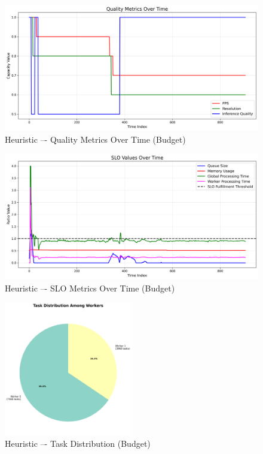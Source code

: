\begin{figure}[h]
    \centering
    \includegraphics[width=\textwidth]{img/results/variable_computational_budget/heuristic_quality_metrics.png}
    \caption{Heuristic –- Quality Metrics Over Time (Budget)}
\end{figure}
\begin{figure}[h]
    \centering
    \includegraphics[width=\textwidth]{img/results/variable_computational_budget/heuristic_slo_values.png}
    \caption{Heuristic –- SLO Metrics Over Time (Budget)}
\end{figure}
\begin{figure}[h]
    \centering
    \includegraphics[width=0.5\textwidth]{img/results/variable_computational_budget/heuristic_task_distribution_pie.png}
    \caption{Heuristic –- Task Distribution (Budget)}
\end{figure}
